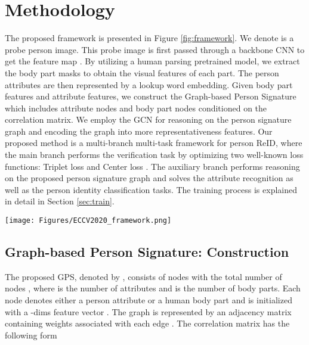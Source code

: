 \documentclass[final]{cvpr}
\begin{document}
\section{Methodology}
\label{sec:method}
The proposed framework is presented in Figure \ref{fig:framework}. We denote  is a probe person image. This probe image  is first passed through a backbone CNN to get the feature map . By utilizing a human parsing pretrained model, we extract the body part masks to obtain the visual features of each part. The person attributes are then represented by a lookup word embedding. Given body part features and attribute features, we construct the Graph-based Person Signature which includes attribute nodes and body part nodes conditioned on the correlation matrix. We employ the GCN \cite{kipf2016semi} for reasoning on the person signature graph and encoding the graph into more representativeness features. Our proposed method is a multi-branch multi-task framework for person ReID, where the main branch performs the verification task by optimizing two well-known loss functions: Triplet loss \cite{weinberger2006distance} and Center loss \cite{centerloss}. The auxiliary branch performs reasoning on the proposed person signature graph and solves the attribute recognition as well as the person identity classification tasks. The training process is explained in detail in Section \ref{sec:train}.

\begin{figure*}
    \centering
    \texttt{[image: Figures/ECCV2020\_framework.png]}
    \caption{Illustration of our proposed framework including two branches: (1) global branch which extracts person global features; (2) GPS branch which performs reasoning the person attributes and body parts using GCN.} \label{fig:framework}
\end{figure*}

\subsection{Graph-based Person Signature: Construction}
\label{sec:graph}
The proposed GPS, denoted by , consists of nodes  with the total number of nodes , where  is the number of attributes and  is the number of body parts. Each node denotes either a person attribute or a human body part and is initialized with a -dims feature vector . The graph is represented by an adjacency matrix  containing weights associated with each edge . The correlation matrix  has the following form
\end{document}
